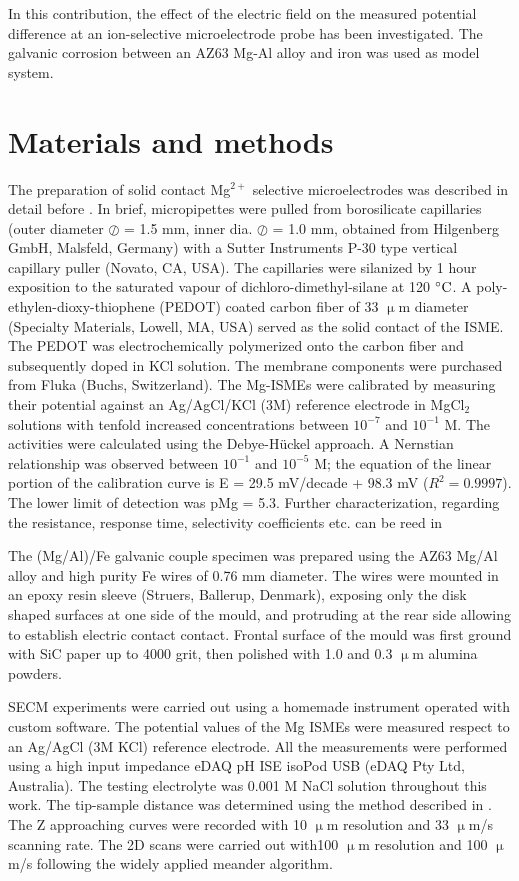 \documentclass[3p]{elsarticle}
\begin{document}
In this contribution, the effect of the electric field on the measured potential difference at an ion-selective microelectrode probe has been investigated. The galvanic corrosion between an AZ63 Mg-Al alloy and iron was used as model system.

\section{Materials and methods}

The preparation of solid contact Mg$^{2+}$ selective microelectrodes was described in detail before \cite{overmg3}. In brief, micropipettes were pulled from borosilicate capillaries (outer diameter $\oslash$ = 1.5 mm, inner dia. $\oslash$ = 1.0 mm, obtained from Hilgenberg GmbH, Malsfeld, Germany) with a Sutter Instruments P-30 type vertical capillary puller (Novato, CA, USA). The capillaries were silanized by 1 hour exposition to the saturated vapour of dichloro-dimethyl-silane at 120 $\celsius$. A poly-ethylen-dioxy-thiophene (PEDOT) coated carbon fiber of 33 $\upmu$m diameter (Specialty Materials, Lowell, MA, USA) served as the solid contact of the ISME. The PEDOT was electrochemically polymerized onto the carbon fiber and subsequently doped in KCl solution. The membrane components were purchased from Fluka (Buchs, Switzerland).
The Mg-ISMEs were calibrated by measuring their potential against an Ag/AgCl/KCl (3M) reference electrode in MgCl$_2$ solutions with tenfold increased concentrations between $10^{-7}$ and $10^{-1}$ M. The activities were calculated using the Debye-Hückel approach. A Nernstian relationship was observed between $10^{-1}$ and $10^{-5}$ M; the equation of the linear portion of the calibration curve is E = 29.5 mV/decade + 98.3 mV ($R^2=0.9997$). The lower limit of detection was pMg = 5.3. Further characterization, regarding the resistance, response time, selectivity coefficients etc. can be reed in \cite{overmg3, mihaela mg}

The (Mg/Al)/Fe galvanic couple specimen was prepared using the AZ63 Mg/Al alloy and high purity Fe wires of 0.76 mm diameter. The wires were mounted in an epoxy resin sleeve (Struers, Ballerup, Denmark), exposing only the disk shaped surfaces at one side of the mould, and protruding at the rear side allowing to establish electric contact contact. Frontal surface of the mould was first ground with SiC paper up to 4000 grit, then polished with 1.0 and 0.3 $\upmu$m alumina powders.

SECM experiments were carried out using a homemade instrument operated with custom software. The potential values of the Mg ISMEs were measured respect to an Ag/AgCl (3M KCl) reference electrode. All the measurements were performed using a high input impedance eDAQ pH ISE isoPod USB (eDAQ Pty Ltd, Australia). The testing electrolyte was 0.001 M NaCl solution throughout this work. The tip-sample distance was determined using the method described in \cite{overmg3}. The Z approaching curves were recorded with 10 $\upmu$m resolution and 33 $\upmu$m/s scanning rate. The 2D scans were carried out with100 $\upmu$m resolution and 100 $\upmu$m/s following the widely applied meander algorithm.
\end{document}
